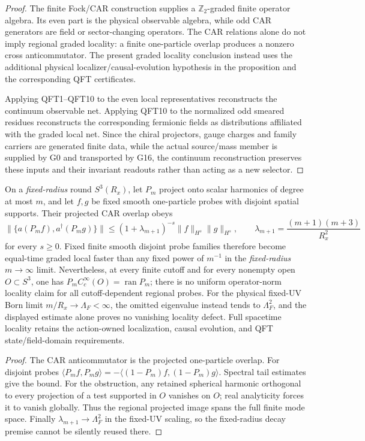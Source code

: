 \documentclass[12pt,a4paper]{article}
\begin{document}
\begin{proof}
The finite Fock/CAR construction supplies a \(\mathbb Z_2\)-graded finite operator algebra.  Its even part is the physical observable algebra, while odd CAR generators are field or sector-changing operators.  The CAR relations alone do not imply regional graded locality: a finite one-particle overlap produces a nonzero cross anticommutator. The present graded locality conclusion instead uses the additional physical localizer/causal-evolution hypothesis in the proposition and the corresponding QFT certificates.

Applying QFT1--QFT10 to the even local representatives reconstructs the continuum observable net.  Applying QFT10 to the normalized odd smeared residues reconstructs the corresponding fermionic fields as distributions affiliated with the graded local net.  Since the chiral projectors, gauge charges and family carriers are generated finite data, while the actual source/mass member is supplied by G0 and transported by G16, the continuum reconstruction preserves these inputs and their invariant readouts rather than acting as a new selector.
\end{proof}


\begin{proposition}
\label{p12:prop:v382-fixed-radius-smooth-car-locality}
On a \emph{fixed-radius} round $S^3(R_x)$, let $P_m$ project onto scalar
harmonics of degree at most $m$, and let $f,g$ be fixed smooth one-particle
probes with disjoint spatial supports. Their projected CAR overlap obeys
\[
 \|\{a(P_mf),a^\dagger(P_mg)\}\|
 \le(1+\lambda_{m+1})^{-s}\|f\|_{H^s}\|g\|_{H^s},
 \qquad\lambda_{m+1}=\frac{(m+1)(m+3)}{R_x^2}
\]
for every $s\ge0$. Fixed finite smooth disjoint probe families
therefore become equal-time graded local faster than any fixed power of
$m^{-1}$ in the \emph{fixed-radius} $m\to\infty$ limit.
Nevertheless, at every finite cutoff and for every nonempty open
$O\subset S^3$, one has $P_mC_c^\infty(O)=\operatorname{ran}P_m$;
there is no uniform operator-norm locality claim for all cutoff-dependent
regional probes.
For the physical fixed-UV Born limit
$m/R_x\to\Lambda_F<\infty$, the omitted eigenvalue instead tends to
$\Lambda_F^2$, and the displayed estimate alone proves no vanishing
locality defect. Full spacetime locality retains the action-owned
localization, causal evolution, and QFT state/field-domain requirements.
\end{proposition}
\begin{proof}
The CAR anticommutator is the projected one-particle overlap.
For disjoint probes $\langle P_mf,P_mg\rangle
=-\langle(1-P_m)f,(1-P_m)g\rangle$. Spectral tail estimates give the
bound. For the obstruction, any retained spherical harmonic orthogonal
to every projection of a test supported in $O$ vanishes on $O$; real
analyticity forces it to vanish globally. Thus the regional projected
image spans the full finite mode space. Finally
$\lambda_{m+1}\to\Lambda_F^2$ in the fixed-UV scaling, so the
fixed-radius decay premise cannot be silently reused there.
\end{proof}
\end{document}
